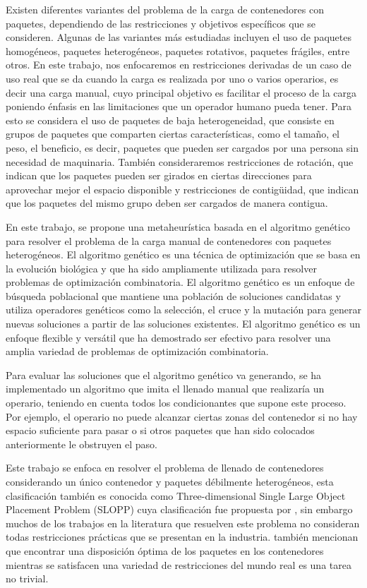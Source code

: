 \documentclass[openany]{article}
\begin{document}
Existen diferentes variantes del problema de la carga de contenedores con paquetes, dependiendo de las restricciones y objetivos específicos que se consideren. Algunas de las variantes más estudiadas incluyen el uso de paquetes homogéneos, paquetes heterogéneos, paquetes rotativos, paquetes frágiles, entre otros. En este trabajo, nos enfocaremos en restricciones derivadas de un caso de uso real que se da cuando la carga es realizada por uno o varios operarios, es decir una carga manual, cuyo principal objetivo es facilitar el proceso de la carga poniendo énfasis en las limitaciones que un operador humano pueda tener. Para esto se considera el uso de paquetes de baja heterogeneidad, que consiste en grupos de paquetes que comparten ciertas características, como el tamaño, el peso, el beneficio, es decir, paquetes que pueden ser cargados por una persona sin necesidad de maquinaria. También consideraremos restricciones de rotación, que indican que los paquetes pueden ser girados en ciertas direcciones para aprovechar mejor el espacio disponible y restricciones de contigüidad, que indican que los paquetes del mismo grupo deben ser cargados de manera contigua.

En este trabajo, se propone una metaheurística basada en el algoritmo genético para resolver el problema de la carga manual de contenedores con paquetes heterogéneos. El algoritmo genético es una técnica de optimización que se basa en la evolución biológica y que ha sido ampliamente utilizada para resolver problemas de optimización combinatoria. El algoritmo genético es un enfoque de búsqueda poblacional que mantiene una población de soluciones candidatas y utiliza operadores genéticos como la selección, el cruce y la mutación para generar nuevas soluciones a partir de las soluciones existentes. El algoritmo genético es un enfoque flexible y versátil que ha demostrado ser efectivo para resolver una amplia variedad de problemas de optimización combinatoria.

Para evaluar las soluciones que el algoritmo genético va generando, se ha implementado un algoritmo que imita el llenado manual que realizaría un operario, teniendo en cuenta todos los condicionantes que supone este proceso. Por ejemplo, el operario no puede alcanzar ciertas zonas del contenedor si no hay espacio suficiente para pasar o si otros paquetes que han sido colocados anteriormente le obstruyen el paso.

Este trabajo se enfoca en resolver el problema de llenado de contenedores considerando un único contenedor y paquetes débilmente heterogéneos, esta clasificación también es conocida como Three-dimensional Single Large Object Placement Problem (SLOPP) cuya clasificación fue propuesta por \textcite{WASCHER20071109}, sin embargo muchos de los trabajos en la literatura que resuelven este problema no consideran todas restricciones prácticas que se presentan en la industria. \textcite{SAFAK2023106199} también mencionan que encontrar una disposición óptima de los paquetes en los contenedores mientras se satisfacen una variedad de restricciones del mundo real es una tarea no trivial.
\end{document}
